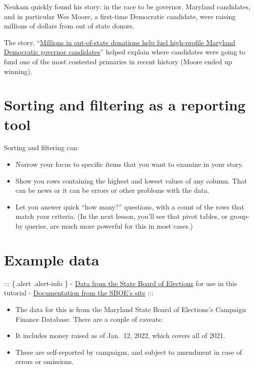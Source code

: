 \documentclass[
  letterpaper,
  DIV=11,
  numbers=noendperiod]{scrreprt}
\providecommand{\tightlist}{%
  \setlength{\itemsep}{0pt}\setlength{\parskip}{0pt}}\usepackage{longtable,booktabs,array}
\begin{document}
Neukam quickly found his story: in the race to be governor, Maryland
candidates, and in particular Wes Moore, a first-time Democratic
candidate, were raising millions of dollars from out of state donors.

The story,
``\href{https://cnsmaryland.org/2022/03/03/millions-in-out-of-state-donations-help-fuel-high-profile-maryland-democratic-governor-candidates/}{Millions
in out-of-state donations help fuel high-profile Maryland Democratic
governor candidates}'' helped explain where candidates were going to
fund one of the most contested primaries in recent history (Moore ended
up winning).

\hypertarget{sorting-and-filtering-as-a-reporting-tool}{%
\section{Sorting and filtering as a reporting
tool}\label{sorting-and-filtering-as-a-reporting-tool}}

Sorting and filtering can:

\begin{itemize}
\tightlist
\item
  Narrow your focus to specific items that you want to examine in your
  story.
\item
  Show you rows containing the highest and lowest values of any column.
  That can be news or it can be errors or other problems with the data.
\item
  Let you answer quick ``how many?'' questions, with a count of the rows
  that match your criteria. (In the next lesson, you'll see that pivot
  tables, or group-by queries, are much more powerful for this in most
  cases.)
\end{itemize}

\hypertarget{example-data}{%
\section{Example data}\label{example-data}}

::: \{.alert .alert-info \} -
\href{https://github.com/stephenneukam/CNS_Annapolis/tree/main/Campaign_finance}{Data
from the State Board of Elections} for use in this tutorial -
\href{https://campaignfinance.maryland.gov/Public/ViewReceiptsMain}{Documentation
from the SBOE's site} :::

\begin{itemize}
\item
  The data for this is from the Maryland State Board of Elections's
  Campaign Finance Database. There are a couple of caveats:
\item
  It includes money raised as of Jan.~12, 2022, which covers all of
  2021.
\item
  These are self-reported by campaigns, and subject to amendment in case
  of errors or omissions.
\end{itemize}
\end{document}
